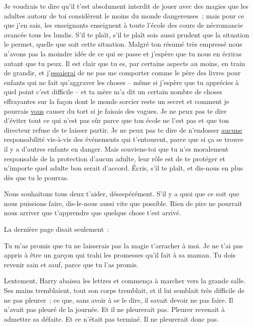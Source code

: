 \begin{writtenNote}
Je voudrais te dire qu'il t'est absolument interdit de jouer avec des magies que les adultes autour de toi considèrent le moins du monde dangereuses~; mais pour ce que j'en sais, les enseignants enseignent à toute l'école des cours de nécromancie avancée tous les lundis.
S'il te plaît, s'il te plaît sois aussi prudent que la situation le permet, quelle que soit cette situation.
Malgré ton résumé très empressé nous n'avons pas la moindre idée de ce qui se passe et j'espère que tu nous en écriras autant que tu peux.
Il est clair que tu es, par certains aspects au moins, en train de grandir, et j'\underline{essaierai} de ne pas me comporter comme le père des livres pour enfants qui ne fait qu'aggraver les choses -- même si j'espère que tu apprécies à quel point c'est difficile -- et ta mère m'a dit un certain nombre de choses effrayantes sur la façon dont le monde sorcier reste un secret et comment je pourrais \underline{vous} causer du tort si je faisais des vagues.
Je ne peux pas te dire d'éviter tout ce qui n'est pas sûr parce que ton école ne l'est pas et que ton directeur refuse de te laisser partir.
Je ne peux pas te dire de n'endosser \underline{aucune} responsabilité vis-à-vis des événements qui t'entourent, parce que si ça se trouve il y a d'autres enfants en danger.
Mais souviens-toi que tu n'es moralement responsable de la protection d'aucun adulte, leur rôle est de te protéger et n'importe quel adulte bon serait d'accord.
Écris, s'il te plaît, et dis-nous en plus dès que tu le pourras.

Nous souhaitons tous deux t'aider, désespérément.
S'il y a quoi que ce soit que nous puissions faire, dis-le-nous aussi vite que possible.
Rien de pire ne pourrait nous arriver que t'apprendre que quelque chose t'est arrivé.

\end{writtenNote}

La dernière page disait seulement~:

\begin{writtenNote}
Tu m'as promis que tu ne laisserais pas la magie t'arracher à moi.
Je ne t'ai pas appris à être un garçon qui trahi les promesses qu'il fait à sa maman.
Tu dois revenir sain et sauf, parce que tu l'as promis.

\end{writtenNote}

Lentement, Harry abaissa les lettres et commença à marcher vers la grande salle.
Ses mains tremblaient, tout son corps tremblait, et il lui semblait très difficile de ne pas pleurer~; ce que, sans avoir à se le dire, il savait devoir ne pas faire.
Il n'avait pas pleuré de la journée.
Et il ne pleurerait pas.
Pleurer revenait à admettre sa défaite.
Et ce n'était pas terminé.
Il ne pleurerait donc pas.

